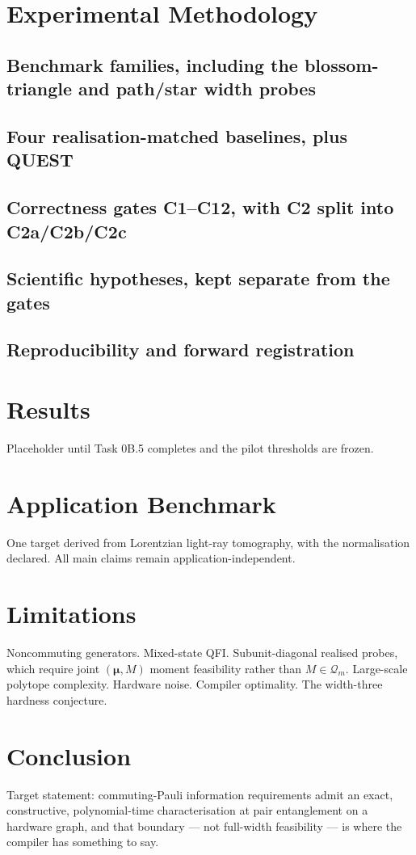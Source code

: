 \documentclass[11pt]{article}
\begin{document}
\section{Experimental Methodology}
\subsection{Benchmark families, including the blossom-triangle and path/star width probes}
\subsection{Four realisation-matched baselines, plus QUEST}
\subsection{Correctness gates C1--C12, with C2 split into C2a/C2b/C2c}
\subsection{Scientific hypotheses, kept separate from the gates}
\subsection{Reproducibility and forward registration}

\section{Results}
Placeholder until Task 0B.5 completes and the pilot thresholds are frozen.

\section{Application Benchmark}
One target derived from Lorentzian light-ray tomography, with the normalisation declared. All
main claims remain application-independent.

\section{Limitations}
Noncommuting generators. Mixed-state QFI. Subunit-diagonal realised probes, which require
joint $(\bm\mu,M)$ moment feasibility rather than $M\in\mathcal Q_m$. Large-scale polytope
complexity. Hardware noise. Compiler optimality. The width-three hardness conjecture.

\section{Conclusion}
Target statement: commuting-Pauli information requirements admit an exact, constructive,
polynomial-time characterisation at pair entanglement on a hardware graph, and that boundary
--- not full-width feasibility --- is where the compiler has something to say.
\end{document}
